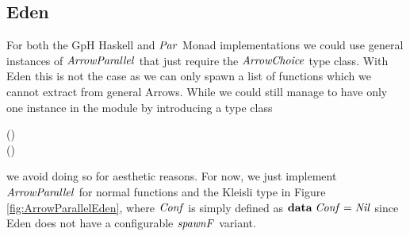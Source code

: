 \documentclass[paper=A4,twoside=true,openright,parskip=full,chapterprefix=true,headings=normal,bibliography=totoc,listof=totoc,titlepage=on,captions=tableabove,draft=false,british]{scrreprt}%
\begin{document}
\hypertarget{eden-1}{%
\subsection{Eden}\label{eden-1}}

\label{sec:parrows-Eden}

For both the GpH Haskell and \ensuremath{\Conid{Par}} Monad implementations we could use
general instances of \ensuremath{\Conid{ArrowParallel}} that just require the \ensuremath{\Conid{ArrowChoice}}
type class. With Eden this is not the case as we can only spawn a list
of functions which we cannot extract from general Arrows. While we could
still manage to have only one instance in the module by introducing a
type class


\begin{hscode}\SaveRestoreHook
{}%
%
%
\>[B]{}\;(\;)\Rightarrow {}\;\;\<[E]%
\\
\>[B]{}\<[5]%
\>[5]{}\mathbin{::}\;\;\to (\to {}){}\<[E]%
\ColumnHook
\end{hscode}\resethooks
\vspace{-2\baselineskip}

we avoid doing so for aesthetic reasons. For now, we just implement
\ensuremath{\Conid{ArrowParallel}} for normal functions and the Kleisli type in Figure
\ref{fig:ArrowParallelEden}, where \ensuremath{\Conid{Conf}} is simply defined as
\ensuremath{\mathbf{data}\;\Conid{Conf}\mathrel{=}\Conid{Nil}} since Eden does not have a configurable \ensuremath{\Varid{spawnF}}
variant.
\end{document}
